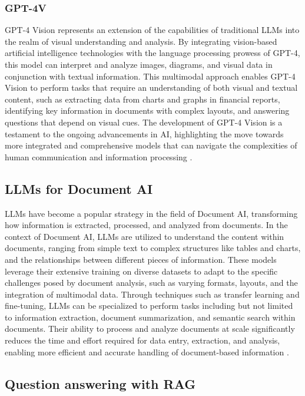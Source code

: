 \documentclass[english, 12pt, a4paper, elec, utf8, a-2b, online]{aaltothesis}
\begin{document}
\subsubsection{GPT-4V}

GPT-4 Vision represents an extension of the capabilities of traditional \ac{LLM}s into the realm of visual understanding and analysis.
By integrating vision-based artificial intelligence technologies with the language processing prowess of GPT-4, this model can interpret and analyze images, diagrams, and visual data in conjunction with textual information.
This multimodal approach enables GPT-4 Vision to perform tasks that require an understanding of both visual and textual content, such as extracting data from charts and graphs in financial reports, identifying key information in documents with complex layouts, and answering questions that depend on visual cues.
The development of GPT-4 Vision is a testament to the ongoing advancements in AI, highlighting the move towards more integrated and comprehensive models that can navigate the complexities of human communication and information processing \cite{2023GPT4VisionSC}.

\subsection{\ac{LLM}s for Document AI}

\ac{LLM}s have become a popular strategy in the field of Document AI, transforming how information is extracted, processed, and analyzed from documents.
In the context of Document AI, \ac{LLM}s are utilized to understand the content within documents, ranging from simple text to complex structures like tables and charts, and the relationships between different pieces of information.
These models leverage their extensive training on diverse datasets to adapt to the specific challenges posed by document analysis, such as varying formats, layouts, and the integration of multimodal data.
Through techniques such as transfer learning and fine-tuning, \ac{LLM}s can be specialized to perform tasks including but not limited to information extraction, document summarization, and semantic search within documents.
Their ability to process and analyze documents at scale significantly reduces the time and effort required for data entry, extraction, and analysis, enabling more efficient and accurate handling of document-based information \cite{}.

\subsection{Question answering with \ac{RAG}}
\end{document}
